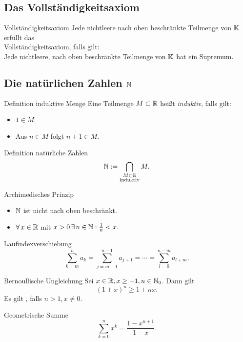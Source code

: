 \documentclass[main.tex]{subfiles}
\begin{document}
\subsection*{Das Vollständigkeitsaxiom}
\begin{karte}{Vollständigkeitsaxiom}
    Jede nichtleere nach oben beschränkte Teilmenge von \( \mathbb{K} \) erfüllt das\\
    Vollständigkeitsaxiom, falls gilt:\\
    Jede nichtleere, nach oben beschränkte Teilmenge von \( \mathbb{K} \) hat ein Supremum.
\end{karte}
\subsection*{Die natürlichen Zahlen \( \mathbb{N} \)}
\begin{karte}{Definition induktive Menge}
    Eine Teilmenge \( M \subset \mathbb{R} \) heißt \textit{induktiv}, falls gilt:
    \begin{itemize}
        \item \( 1 \in M \).
        \item Aus \( n \in M \) folgt \( n + 1 \in M \).
    \end{itemize}
\end{karte}
\begin{karte}{Definition natürliche Zahlen}
    \[ \mathbb{N} := \bigcap_{\substack{M\subset \mathbb{R} \\ \text{induktiv}}} M. \]
\end{karte}
\begin{karte}{Archimedisches Prinzip}
    \begin{itemize}
        \item \( \mathbb{N} \) ist nicht nach oben beschränkt.
        \item \( \forall x \in \R \) mit \( x > 0 \, \exists n \in \N: \frac{1}{n} < x. \)
    \end{itemize}
\end{karte}
\begin{karte}{Laufindexverschiebung}
    \[ \sum_{k=m}^n a_k = \sum_{j=m-1}^{n-1} a_{j+1} = \cdots = \sum_{l=0}^{n-m} a_{l+m}. \]
\end{karte}
\begin{karte}{Bernoullische Ungleichung}
    Sei \( x \in \mathbb{R}, x \geq -1, n \in \mathbb{N}_0 \). Dann gilt 
    \[ {(1+x)}^n \geq 1 + nx. \]
    Es gilt \gqq{\(>\)}, falls \(n > 1, x \neq 0\).
\end{karte}
\begin{karte}{Geometrische Summe}
    \[ \sum_{k=0}^n x^k = \frac{1 - x^{n+1}}{1 - x}. \]
\end{karte}
\end{document}
